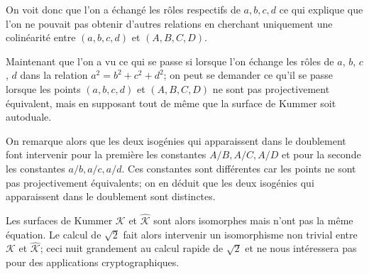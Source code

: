 \documentclass[a4paper,12pt]{article}
\theoremstyle{definition}
\theoremstyle{remark}
\numberwithin{equation}{section}
\begin{document}
On voit donc que l'on a échangé les rôles respectifs de $a,b,c,d$ ce qui explique que l'on ne pouvait pas obtenir d'autres relations en cherchant uniquement une colinéarité entre $(a,b,c,d)$ et $(A,B,C,D)$.

Maintenant que l'on a vu ce qui se passe si lorsque l'on échange les rôles de $a$, $b$, $c$, $d$ dans la relation $a^2 = b^2 + c^2 + d^2$; on peut se demander ce qu'il se passe lorsque les points $(a,b,c,d)$ et $(A,B,C,D)$ ne sont pas projectivement équivalent, mais en supposant tout de même que la surface de Kummer soit autoduale.

On remarque alors que les deux isogénies qui apparaissent dans le doublement font intervenir pour la première les constantes $A/B,A/C,A/D$ et pour la seconde les constantes $a/b,a/c,a/d$. Ces constantes sont différentes car les points ne sont pas projectivement équivalents; on en déduit que les deux isogénies qui apparaissent dans le doublement sont distinctes.

Les surfaces de Kummer $\mathcal{K}$ et $\hat{\mathcal{K}}$ sont alors isomorphes mais n'ont pas la même équation. Le calcul de $\sqrt{2}$ fait alors intervenir un isomorphisme non trivial entre $\mathcal{K}$ et $\hat{\mathcal{K}}$; ceci nuit grandement au calcul rapide de $\sqrt{2}$ et ne nous intéressera pas pour des applications cryptographiques.


%
\end{document}
